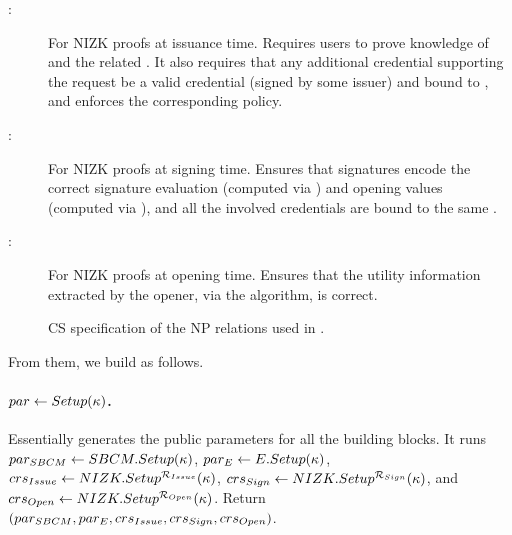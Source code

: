 \begin{description}
\item[\RelIss:] For NIZK proofs at issuance time. Requires users to
  prove knowledge of \usk and the related \upk. It also requires that any
  additional credential supporting the request be a valid credential (signed by
  some issuer) and bound to \upk, and enforces the corresponding \fissue policy.
\item[\RelSig:] For NIZK proofs at signing time. Ensures that
  signatures encode the correct signature evaluation (computed via \feval)
  and opening values (computed via \finsp), and all the involved
  credentials are bound to the same \upk.
\item[\RelIns:] For NIZK proofs at opening time. Ensures that the
  utility information extracted by the opener, via the \Open algorithm, is
  correct.
\end{description}

\begin{figure}[ht!]
  \centering
  \scalebox{0.85}{
    
  }
  \caption{CS specification of the NP relations used in \CUASGen.
  }
  \label{fig:nizkrels}
\end{figure}

From them, we build \CUASGen as follows.

\paragraph{$par \gets Setup(\kappa)$.} %
Essentially generates the public parameters for all the building blocks. It runs
$par_{SBCM} \gets SBCM.Setup(\kappa)$, $par_{E} \gets E.Setup(\kappa)$,
$crs_{Issue} \gets NIZK.Setup^{\mathcal{R}_{Issue}}(\kappa)$,
$crs_{Sign} \gets NIZK.Setup^{\mathcal{R}_{Sign}}(\kappa)$, and
$crs_{Open} \gets NIZK.Setup^{\mathcal{R}_{Open}}(\kappa)$. Return
$(par_{SBCM},par_{E},crs_{Issue},crs_{Sign},crs_{Open})$.


